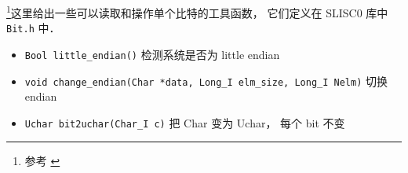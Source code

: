 
\footnote{参考 \cite{NR3}}这里给出一些可以读取和操作单个比特的工具函数， 它们定义在 SLISC0 库中 \verb|Bit.h| 中．

\begin{itemize}
\item \verb|Bool little_endian()| 检测系统是否为 little endian
\item \verb|void change_endian(Char *data, Long_I elm_size, Long_I Nelm)| 切换 endian
\item \verb|Uchar bit2uchar(Char_I c)| 把 Char 变为 Uchar， 每个 bit 不变
\end{itemize}

